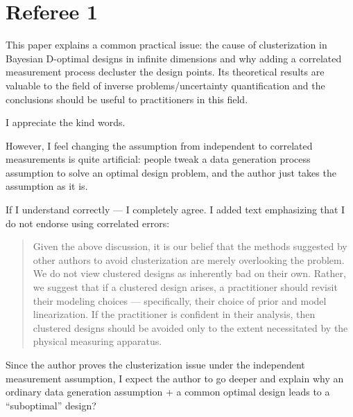 \section{Referee 1}\label{ref1}
\RC This paper explains a common practical issue: the cause of
clusterization in Bayesian D-optimal designs in infinite dimensions
and why adding a correlated measurement process decluster the design
points. Its theoretical results are valuable to the field of inverse
problems/uncertainty quantification and the conclusions should be
useful to practitioners in this field.

\AR I appreciate the kind words.


\RC However, I feel changing the assumption from independent to correlated
measurements is quite artificial: people tweak a data generation
process assumption to solve an optimal design problem, and the author
just takes the assumption as it is.

\AR If I understand correctly --- I completely agree. I added text
emphasizing that I do not endorse using correlated errors:

\begin{quote} %
Given the above discussion, it is our belief that the methods
suggested by other authors to avoid clusterization are merely
overlooking the problem. We do not view clustered designs as
inherently bad on their own. Rather, we suggest that if a clustered
design arises, a practitioner should revisit their modeling choices
--- specifically, their choice of prior and model linearization. If
the practitioner is confident in their analysis, then clustered
designs should be avoided only to the extent necessitated by the
physical measuring apparatus.
\end{quote}

\RC Since the author proves the clusterization issue under the independent
measurement assumption, I expect the author to go deeper and explain
why an ordinary data generation assumption + a common optimal design
leads to a “suboptimal” design?

